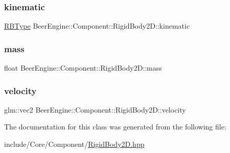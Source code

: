 \subsubsection{\texorpdfstring{kinematic}{kinematic}}
{\footnotesize\ttfamily \mbox{\hyperlink{namespace_beer_engine_1_1_component_a2cfe279cc309b6420e792597940b8a33}{R\+B\+Type}} Beer\+Engine\+::\+Component\+::\+Rigid\+Body2\+D\+::kinematic}

\mbox{\label{class_beer_engine_1_1_component_1_1_rigid_body2_d_a65249c4a9bb801725bfb4235e8d0f244}} 
\subsubsection{\texorpdfstring{mass}{mass}}
{\footnotesize\ttfamily float Beer\+Engine\+::\+Component\+::\+Rigid\+Body2\+D\+::mass}

\mbox{\label{class_beer_engine_1_1_component_1_1_rigid_body2_d_a485653f0ef04660b094871be32a6b0a7}} 
\subsubsection{\texorpdfstring{velocity}{velocity}}
{\footnotesize\ttfamily glm\+::vec2 Beer\+Engine\+::\+Component\+::\+Rigid\+Body2\+D\+::velocity}



The documentation for this class was generated from the following file\+:\begin{DoxyCompactItemize}
\item 
include/\+Core/\+Component/\mbox{\hyperlink{_rigid_body2_d_8hpp}{Rigid\+Body2\+D.\+hpp}}\end{DoxyCompactItemize}
